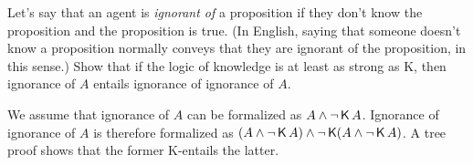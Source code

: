 \begin{exercise}
  Let's say that an agent is \emph{ignorant of} a proposition if they don't know
  the proposition and the proposition is true. (In English, saying that someone
  doesn't know a proposition normally conveys that they are ignorant of the
  proposition, in this sense.) Show that if the logic of knowledge is at least as
  strong as K, then ignorance of $A$ entails ignorance of ignorance of $A$.
\end{exercise}
\begin{solution}
  We assume that ignorance of $A$ can be formalized as $A \land \neg \operatorname{\mathsf{K}{}} A$. Ignorance of ignorance of $A$ is therefore formalized as $(A \land \neg \operatorname{\mathsf{K}{}} A) \land \neg \operatorname{\mathsf{K}{}}(A \land \neg \operatorname{\mathsf{K}{}} A)$. A tree proof shows that the former K-entails the latter. 
\end{solution}
  



